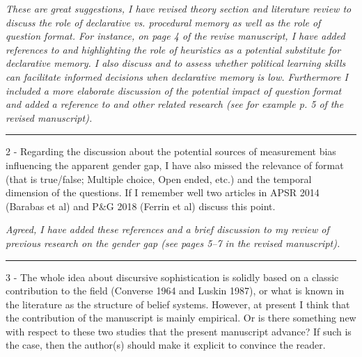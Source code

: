 \textit{These are great suggestions, I have revised theory section and literature review to discuss the role of declarative vs. procedural memory as well as the role of question format. For instance, on page 4 of the revise manuscript, I have added references to \citet{lupia1994shortcuts,lau2001advantages} and \citet{lau2008exploration} highlighting the role of heuristics as a potential substitute for declarative memory. I also discuss \citet{prior2008money} and \citet{bernhard2020more} to assess whether political learning skills can facilitate informed decisions when declarative memory is low. Furthermore I included a more elaborate discussion of the potential impact of question format and added a reference to \citet{fraile2020unpacking} and other related research (see for example p. 5 of the revised manuscript).}


\rule{\linewidth}{.01cm}

2 - Regarding the discussion about the potential sources of measurement bias influencing the apparent gender gap, I have also missed the relevance of format (that is true/false; Multiple choice, Open ended, etc.) and the temporal dimension of the questions. If I remember well two articles in APSR 2014 (Barabas et al) and P\&G 2018 (Ferrin et al) discuss this point.

\textit{Agreed, I have added these references and a brief discussion to my review of previous research on the gender gap (see pages 5--7 in the revised manuscript).}


\rule{\linewidth}{.01cm}

3 - The whole idea about discursive sophistication is solidly based on a classic contribution to the field (Converse 1964 and Luskin 1987), or what is known in the literature as the structure of belief systems. However, at present I think that the contribution of the manuscript is mainly empirical. Or is there something new with respect to these two studies that the present manuscript advance? If such is the case, then the author(s) should make it explicit to convince the reader.

